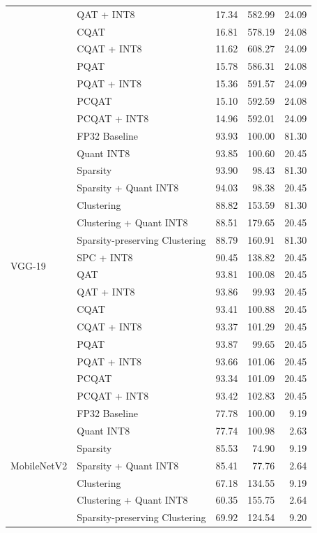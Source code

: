 \begin{table}[htbp]
{\begin{tabular}{llrrr}
  & QAT + INT8 & 17.34 & 582.99 & 24.09 \\
  & CQAT & 16.81 & 578.19 & 24.08 \\
  & CQAT + INT8 & 11.62 & 608.27 & 24.09 \\
  & PQAT & 15.78 & 586.31 & 24.08 \\
  & PQAT + INT8 & 15.36 & 591.57 & 24.09 \\
  & PCQAT & 15.10 & 592.59 & 24.08 \\
  & PCQAT + INT8 & 14.96 & 592.01 & 24.09 \\
\midrule
\multirow{16}{*}{VGG-19}
  & FP32 Baseline & 93.93 & 100.00 & 81.30 \\
  & Quant INT8 & 93.85 & 100.60 & 20.45 \\
  & Sparsity & 93.90 & 98.43 & 81.30 \\
  & Sparsity + Quant INT8 & 94.03 & 98.38 & 20.45 \\
  & Clustering & 88.82 & 153.59 & 81.30 \\
  & Clustering + Quant INT8 & 88.51 & 179.65 & 20.45 \\
  & Sparsity-preserving Clustering & 88.79 & 160.91 & 81.30 \\
  & SPC + INT8 & 90.45 & 138.82 & 20.45 \\
  & QAT & 93.81 & 100.08 & 20.45 \\
  & QAT + INT8 & 93.86 & 99.93 & 20.45 \\
  & CQAT & 93.41 & 100.88 & 20.45 \\
  & CQAT + INT8 & 93.37 & 101.29 & 20.45 \\
  & PQAT & 93.87 & 99.65 & 20.45 \\
  & PQAT + INT8 & 93.66 & 101.06 & 20.45 \\
  & PCQAT & 93.34 & 101.09 & 20.45 \\
  & PCQAT + INT8 & 93.42 & 102.83 & 20.45 \\
\midrule
\multirow{16}{*}{MobileNetV2}
  & FP32 Baseline & 77.78 & 100.00 & 9.19 \\
  & Quant INT8 & 77.74 & 100.98 & 2.63 \\
  & Sparsity & 85.53 & 74.90 & 9.19 \\
  & Sparsity + Quant INT8 & 85.41 & 77.76 & 2.64 \\
  & Clustering & 67.18 & 134.55 & 9.19 \\
  & Clustering + Quant INT8 & 60.35 & 155.75 & 2.64 \\
  & Sparsity-preserving Clustering & 69.92 & 124.54 & 9.20 \\

\end{tabular}}
\end{table}
